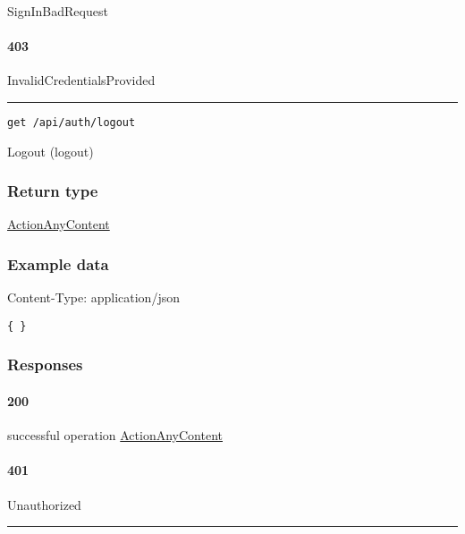 SignInBadRequest \protect\hyperlink{}{}

\hypertarget{section-11}{%
\paragraph{403}\label{section-11}}

InvalidCredentialsProvided \protect\hyperlink{}{}

\begin{center}\rule{0.5\linewidth}{0.5pt}\end{center}


\protect\hypertarget{logout}{}{}



\begin{verbatim}
get /api/auth/logout
\end{verbatim}

Logout ({logout})

\hypertarget{return-type-3}{%
\subsubsection*{Return type}\label{return-type-3}}

\protect\hyperlink{ActionAnyContent}{ActionAnyContent}

\hypertarget{example-data-3}{%
\subsubsection*{Example data}\label{example-data-3}}

Content-Type: application/json

\begin{verbatim}
{ }
\end{verbatim}

\hypertarget{responses-3}{%
\subsubsection*{Responses}\label{responses-3}}

\hypertarget{section-12}{%
\paragraph{200}\label{section-12}}

successful operation
\protect\hyperlink{ActionAnyContent}{ActionAnyContent}

\hypertarget{section-13}{%
\paragraph{401}\label{section-13}}

Unauthorized \protect\hyperlink{}{}

\begin{center}\rule{0.5\linewidth}{0.5pt}\end{center}

